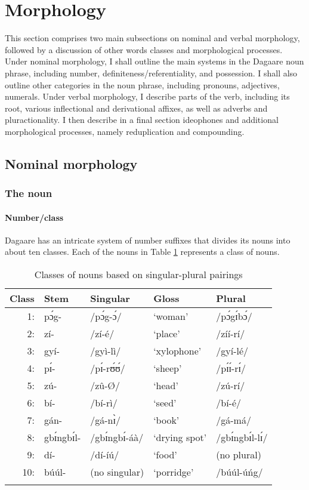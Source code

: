 \section{Morphology}

This section comprises two main subsections on nominal and verbal morphology, followed by a discussion of other words classes and morphological processes. Under
nominal morphology, I shall outline the main systems in the Dagaare noun phrase, including
number, definiteness/referentiality, and possession. I shall also outline other categories in the
noun phrase, including pronouns, adjectives, numerals. Under verbal morphology, I describe
parts of the verb, including its root, various inflectional and derivational affixes, as well as adverbs and pluractionality.  I then describe in a final section 
ideophones and additional morphological processes, namely reduplication and
compounding.

\subsection{Nominal morphology}
\subsubsection{ The noun}
\paragraph{Number/class}

Dagaare has an intricate system of number suffixes that divides its nouns into about ten classes. Each of the  nouns in  Table  \ref{tab:classstems}
represents a class of nouns.
\begin{table}
    
    \begin{tabularx}{\textwidth}{rXXXl}
    \lsptoprule
Class & Stem & Singular & Gloss &Plural\\\midrule
    1: & pɔ́g-& /pɔ́g-ɔ́/& ‘woman’& /pɔ́gɪ́bɔ́/  \\
2: &zí- &/zí-é/ &‘place’&/zíí-rí/ \\
3:& gyí-& /gyì-lì/& ‘xylophone’& /gyí-lé/\\
4: &pɪ́-& /pɪ́-rʊ́ʊ́/& ‘sheep’& /pɪ́ɪ́-rɪ́/\\
5: &zú-& /zû-Ø/& ‘head’ &/zú-rí/\\
6: &bí-& /bí-rì/ &‘seed’ &/bí-é/\\
7: &gán- &/gá-nɪ̀/ &‘book’ &/gá-má/\\
8: &gbɪ́ngbɪ́l-& /gbɪ́ngbɪ́-áà/& ‘drying spot’& /gbɪ́ngbɪ́l-lɪ́/\\
9: &dí-& /dí-íú/& ‘food’& (no plural)\\
10: & búúl- &(no singular) &‘porridge’& /búúl-úńg/\\\lspbottomrule
    \end{tabularx}
    \caption{Classes of nouns based on singular-plural pairings}
    \label{tab:classstems}
\end{table}

